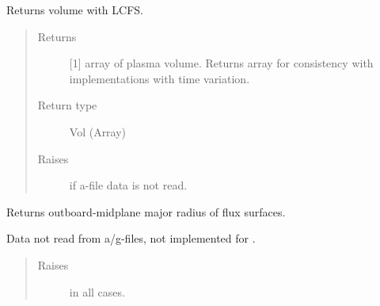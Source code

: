 \documentclass[letterpaper,10pt,english]{sphinxmanual}
\begin{document}
\begin{fulllineitems}
\begin{fulllineitems}
\begin{quote}
\begin{description}
\end{description}\end{quote}

\end{fulllineitems}


\begin{fulllineitems}
\label{\detokenize{eqtools:eqtools.eqdskreader.EqdskReader.getVolLCFS}}
Returns volume with LCFS.
\begin{quote}\begin{description}
\item[{Returns}] \leavevmode
{[}1{]} array of plasma volume.  Returns array for
consistency with
{\hyperref[\detokenize{eqtools:eqtools.core.Equilibrium}]{}}
implementations with time variation.

\item[{Return type}] \leavevmode
Vol (Array)

\item[{Raises}] \leavevmode
{} \textendash{} if a-file data is not read.

\end{description}\end{quote}

\end{fulllineitems}


\begin{fulllineitems}
\label{\detokenize{eqtools:eqtools.eqdskreader.EqdskReader.getRmidPsi}}
Returns outboard-midplane major radius of flux surfaces.

Data not read from a/g-files, not implemented for {\hyperref[\detokenize{eqtools:eqtools.eqdskreader.EqdskReader}]{}}.
\begin{quote}\begin{description}
\item[{Raises}] \leavevmode
{} \textendash{} in all cases.


\end{description}
\end{quote}
\end{fulllineitems}
\end{fulllineitems}
\end{document}
